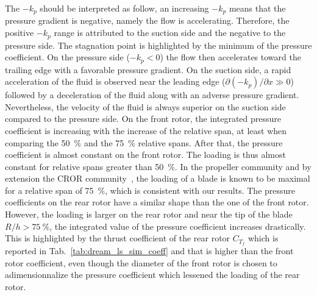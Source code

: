 The $- k_p$ should be interpreted as follow, an increasing $- k_p$
means that the pressure gradient is negative, namely the flow
is accelerating. Therefore, the positive  $-k_p$ range is attributed
to the suction side and the negative to the pressure side.
The stagnation point is highlighted
by the minimum of the pressure coefficient. On the pressure side 
($-k_p < 0$) the flow then accelerates
toward the trailing edge with a favorable pressure gradient. 
On the suction side, a rapid acceleration of the fluid
is observed near the leading edge 
($\partial (-k_p) / \partial x \gg 0$) followed by
a deceleration of the fluid along with an
adverse pressure gradient.
Nevertheless, the velocity of the fluid is always superior
on the suction side compared to the pressure side.
On the front rotor, the integrated pressure coefficient is
increasing with the increase of the relative span, at least 
when comparing the 50~\% and the 75~\% relative spans.
After that, the pressure coefficient is almost constant on 
the front rotor. The loading is thus almost constant for
relative spans greater than 50~\%. In the propeller community and
by extension the CROR community~\cite{Bousquet2012}, the loading of a blade is known
to be maximal for a relative span of 75~\%, which is consistent
with our results.
The pressure coefficients on the rear rotor have a similar shape
than the one of the front rotor. However, the loading is
larger on the rear rotor and near the tip of the blade
$R/h > 75~\%$, the integrated value of the pressure coefficient
increases drastically. This is highlighted by the thrust coefficient 
of the rear rotor $C_{T_f}$ which is reported in 
Tab.~\ref{tab:dream_ls_sim_coeff} and that is higher than
the front rotor coefficient, even though the diameter of the front
rotor is chosen to adimensionnalize the pressure coefficient which
lessened the loading of the rear rotor.

